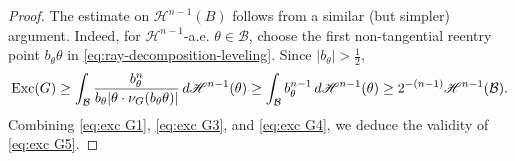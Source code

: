 \documentclass[reqno,11pt]{amsart}
\numberwithin{equation}{section}
\theoremstyle{remark}
\begin{document}
\begin{proof}
The estimate on $\mathscr H^{n-1}(B)$ follows from a similar (but simpler) argument. Indeed,  for $\mathscr H^{n-1}$-a.e. $\theta \in \mathcal B$, choose the first non-tangential reentry point $b_\theta\theta$ in \eqref{eq:ray-decomposition-leveling}. Since $|b_\theta|>\frac 1 2$,
\begin{equation}\label{eq:exc G4}
{\rm Exc}(G )\geq \int_{\mathcal B } \frac{b_\theta^{n}}{ b_\theta |\theta \cdot \nu_{G }(b_\theta \theta)|}\, d\mathscr H^{n-1}(\theta)\geq   \int_{\mathcal B } b_\theta^{n-1}\, d\mathscr H^{n-1}(\theta) \geq 2^{-(n-1)}\mathscr H^{n-1}(\mathcal B ).
\end{equation}
Combining \eqref{eq:exc G1}, \eqref{eq:exc G3}, and \eqref{eq:exc G4}, we deduce the validity of \eqref{eq:exc G5}.





\end{proof}
\end{document}
